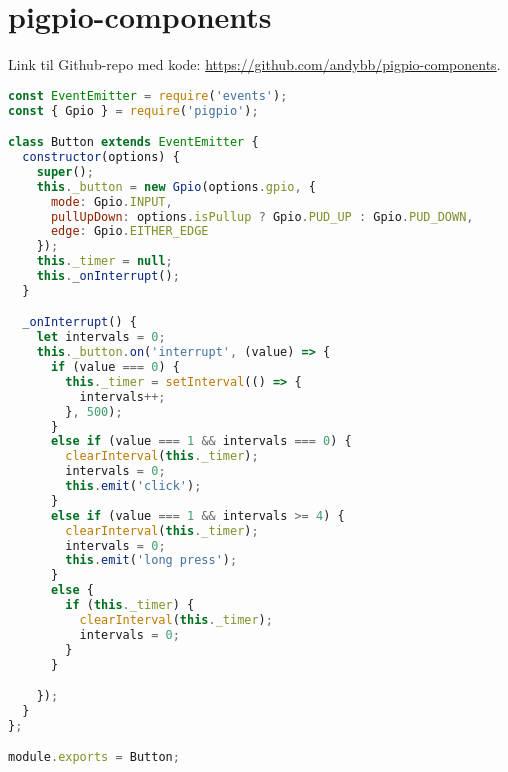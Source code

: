\section{pigpio-components}
\label{appendix:pigpio-components}
Link til Github-repo med kode: \url{https://github.com/andybb/pigpio-components}.

\begin{lstlisting}[frame=single, language=JavaScript,
    caption=pigpio-components: Button class, label=lst:pigpio-components-button]
const EventEmitter = require('events');
const { Gpio } = require('pigpio');

class Button extends EventEmitter {
  constructor(options) {
    super();
    this._button = new Gpio(options.gpio, {
      mode: Gpio.INPUT,
      pullUpDown: options.isPullup ? Gpio.PUD_UP : Gpio.PUD_DOWN,
      edge: Gpio.EITHER_EDGE
    });
    this._timer = null;
    this._onInterrupt();
  }

  _onInterrupt() {
    let intervals = 0;
    this._button.on('interrupt', (value) => {
      if (value === 0) {
        this._timer = setInterval(() => {
          intervals++;
        }, 500);
      }
      else if (value === 1 && intervals === 0) {
        clearInterval(this._timer);
        intervals = 0;
        this.emit('click');
      }
      else if (value === 1 && intervals >= 4) {
        clearInterval(this._timer);
        intervals = 0;
        this.emit('long press');
      }
      else {
        if (this._timer) {
          clearInterval(this._timer);
          intervals = 0;
        }
      }

    });
  }
};

module.exports = Button;

\end{lstlisting}


